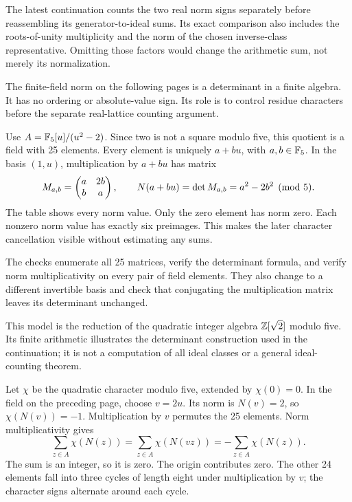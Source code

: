 The latest continuation counts the two real norm signs separately before reassembling its generator-to-ideal sums. Its exact comparison also includes the roots-of-unity multiplicity and the norm of the chosen inverse-class representative. Omitting those factors would change the arithmetic sum, not merely its normalization.

The finite-field norm on the following pages is a determinant in a finite algebra. It has no ordering or absolute-value sign. Its role is to control residue characters before the separate real-lattice counting argument.

Use $A=\mathbb F_5[u]/(u^2-2)$. Since two is not a square modulo five, this quotient is a field with 25 elements. Every element is uniquely $a+bu$, with $a,b\in\mathbb F_5$.
In the basis $(1,u)$, multiplication by $a+bu$ has matrix
\[
M_{a,b}=\begin{pmatrix}a&2b\\b&a\end{pmatrix},
\qquad N(a+bu)=\det M_{a,b}=a^2-2b^2\pmod5.
\]
The table shows every norm value. Only the zero element has norm zero. Each nonzero norm value has exactly six preimages. This makes the later character cancellation visible without estimating any sums.

The checks enumerate all 25 matrices, verify the determinant formula, and verify norm multiplicativity on every pair of field elements. They also change to a different invertible basis and check that conjugating the multiplication matrix leaves its determinant unchanged.

This model is the reduction of the quadratic integer algebra $\mathbb Z[\sqrt2]$ modulo five. Its finite arithmetic illustrates the determinant construction used in the continuation; it is not a computation of all ideal classes or a general ideal-counting theorem.

Let $\chi$ be the quadratic character modulo five, extended by $\chi(0)=0$. In the field on the preceding page, choose $v=2u$. Its norm is $N(v)=2$, so $\chi(N(v))=-1$.
Multiplication by $v$ permutes the 25 elements. Norm multiplicativity gives
\[
\sum_{z\in A}\chi(N(z))
=\sum_{z\in A}\chi(N(vz))
=-\sum_{z\in A}\chi(N(z)).
\]
The sum is an integer, so it is zero. The origin contributes zero. The other 24 elements fall into three cycles of length eight under multiplication by $v$; the character signs alternate around each cycle.

